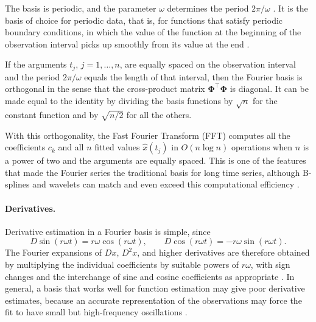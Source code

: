 The basis is periodic, and the parameter $\omega$ determines the period
$2\pi/\omega$ \cite[Sec.~3.4]{ramsay2005}. It is the basis of choice for
periodic data, that is, for functions that satisfy periodic boundary
conditions, in which the value of the function at the beginning of the
observation interval picks up smoothly from its value at the end
\cite[Sec.~3.2.2, 3.3]{ramsay2005}.

\begin{proposition}
\label{prop:fourier_discrete_orthogonality}
If the arguments $t_j$, $j = 1,\dots,n$, are equally spaced on the
observation interval and the period $2\pi/\omega$ equals the length of that
interval, then the Fourier basis is orthogonal in the sense that the
cross-product matrix $\boldsymbol{\Phi}^\top\boldsymbol{\Phi}$ is diagonal.
It can be made equal to the identity by dividing the basis functions by
$\sqrt{n}$ for the constant function and by $\sqrt{n/2}$ for all the others.
\end{proposition}

With this orthogonality, the Fast Fourier Transform (FFT) computes all the
coefficients $c_k$ and all $n$ fitted values $\hat{x}(t_j)$ in $O(n\log n)$
operations when $n$ is a power of two and the arguments are equally spaced.
This is one of the features that made the Fourier series the traditional
basis for long time series, although B-splines and wavelets can match and
even exceed this computational efficiency \cite[Sec.~3.4]{ramsay2005}.

\paragraph{Derivatives.} Derivative estimation in a Fourier basis is simple,
since \cite[Sec.~3.4]{ramsay2005}
\begin{equation}
D\sin(r\omega t) = r\omega\cos(r\omega t),\qquad
D\cos(r\omega t) = -r\omega\sin(r\omega t).
\label{eq:fourier_derivatives}
\end{equation}
The Fourier expansions of $Dx$, $D^2x$, and higher derivatives are therefore
obtained by multiplying the individual coefficients by suitable powers of
$r\omega$, with sign changes and the interchange of sine and cosine
coefficients as appropriate \cite[Sec.~3.4]{ramsay2005}. In general, a basis
that works well for function estimation may give poor derivative estimates,
because an accurate representation of the observations may force the fit to
have small but high-frequency oscillations \cite[Sec.~3.3]{ramsay2005}.

